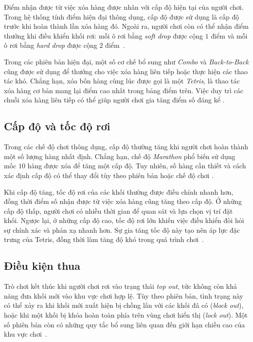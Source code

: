 \documentclass[12pt,a4paper,oneside]{report}
\begin{document}
Điểm nhận được từ việc xóa hàng được nhân với cấp độ hiện tại
của người chơi. Trong hệ thống tính điểm hiện đại thông dụng,
cấp độ được sử dụng là cấp độ trước khi hoàn thành lần xóa hàng
đó. Ngoài ra, người chơi còn có thể nhận điểm thưởng khi điều
khiển khối rơi: mỗi ô rơi bằng \textit{soft drop} được cộng
$1$ điểm và mỗi ô rơi bằng \textit{hard drop} được cộng $2$
điểm~\cite{tetris_scoring}.

Trong các phiên bản hiện đại, một số cơ chế bổ sung như
\textit{Combo} và \textit{Back-to-Back} cũng được sử dụng để
thưởng cho việc xóa hàng liên tiếp hoặc thực hiện các thao tác
khó. Chẳng hạn, xóa bốn hàng cùng lúc được gọi là một
\textit{Tetris}, là thao tác xóa hàng cơ bản mang lại điểm cao
nhất trong bảng điểm trên. Việc duy trì các chuỗi xóa hàng
liên tiếp có thể giúp người chơi gia tăng điểm số đáng kể
\cite{tetris_scoring}.

\subsection{Cấp độ và tốc độ rơi}

Trong các chế độ chơi thông dụng, cấp độ thường tăng khi người
chơi hoàn thành một số lượng hàng nhất định. Chẳng hạn, chế độ
\textit{Marathon} phổ biến sử dụng mốc $10$ hàng được xóa để
tăng một cấp độ. Tuy nhiên, số hàng cần thiết và cách xác định
cấp độ có thể thay đổi tùy theo phiên bản hoặc chế độ chơi
\cite{tetris_guideline,tetris_official}.

Khi cấp độ tăng, tốc độ rơi của các khối thường được điều chỉnh
nhanh hơn, đồng thời điểm số nhận được từ việc xóa hàng cũng
tăng theo cấp độ. Ở những cấp độ thấp, người chơi có nhiều thời
gian để quan sát và lựa chọn vị trí đặt khối. Ngược lại, ở những
cấp độ cao, tốc độ rơi lớn khiến việc điều khiển đòi hỏi sự chính
xác và phản xạ nhanh hơn. Sự gia tăng tốc độ này tạo nên áp lực
đặc trưng của Tetris, đồng thời làm tăng độ khó trong quá trình
chơi~\cite{tetris_official,tetris_scoring}.

\subsection{Điều kiện thua}

Trò chơi kết thúc khi người chơi rơi vào trạng thái
\textit{top out}, tức không còn khả năng đưa khối mới vào khu vực
chơi hợp lệ. Tùy theo phiên bản, tình trạng này có thể xảy ra
khi khối mới xuất hiện bị chồng lấn với các khối đã có
(\textit{block out}), hoặc khi một khối bị khóa hoàn toàn phía
trên vùng chơi hiển thị (\textit{lock out}). Một số phiên bản
còn có những quy tắc bổ sung liên quan đến giới hạn chiều cao
của khu vực chơi~\cite{tetris_topout,tetris_guideline}.
\end{document}
